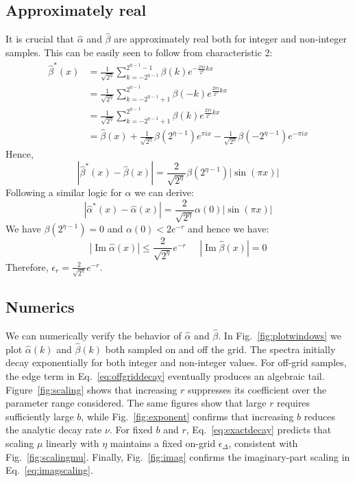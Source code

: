 \documentclass[aps,floatfix,10pt,amssymb,amsfont,amsmath,superscriptaddress,float,nofootinbib,longbibliography,nobalancelastpage,twocolumn]{revtex4-2}
\begin{document}
\subsection{Approximately real}
\label{section:approxiamtely_real}
It is crucial that $\hat \alpha$ and $\hat \beta$ are approximately real both for integer and non-integer samples. This can be easily seen to follow from characteristic 2:
\begin{align}
    \hat\beta^*(x) &=\frac{1}{\sqrt{2^{\eta}}}\sum_{k=-2^{\eta-1}}^{2^{\eta-1}-1} \beta(k)e^{-\frac{2\pi i}{2^{\eta}}kx}\\
    &=\frac{1}{\sqrt{2^{\eta}}}\sum_{k=-2^{\eta-1}+1}^{2^{\eta-1}} \beta(-k)e^{\frac{2\pi i}{2^{\eta}}kx}\\
    &=\frac{1}{\sqrt{2^{\eta}}}\sum_{k=-2^{\eta-1}+1}^{2^{\eta-1}} \beta(k)e^{\frac{2\pi i}{2^{\eta}}kx}\\
    &=\hat \beta(x) + \frac{1}{\sqrt{2^{\eta}}}\beta(2^{\eta-1})e^{\pi i x} - \frac{1}{\sqrt{2^{\eta}}}\beta(-2^{\eta-1})e^{-\pi i x}
\end{align}
Hence,
\begin{equation}
    |\hat\beta^*(x)- \hat\beta(x)| =  \frac{2}{\sqrt{2^{\eta}}}\beta(2^{\eta-1})|\sin (\pi x)|
\end{equation}
Following a similar logic for $\alpha$ we can derive:
\begin{equation}
        |\hat\alpha^*(x)- \hat\alpha(x)| =  \frac{2}{\sqrt{2^{\eta}}}\alpha(0)|\sin (\pi x)|
\end{equation}
We have $\beta(2^{\eta-1}) =0$ and $\alpha(0) < 2e^{-r}$ and hence we have:
\begin{equation}
    \label{eq:imagscaling}|\operatorname{Im}\hat\alpha(x)| \leq \frac{2}{\sqrt{2^{\eta}}}e^{-r} \;\;\;\;\;|\operatorname{Im}\hat\beta(x)| = 0
\end{equation}
Therefore, $\epsilon_r = \frac{2}{\sqrt{2^{\eta}}}e^{-r}$.
\subsection{Numerics}
We can numerically verify the behavior of $\hat \alpha$ and $\hat \beta$. In Fig.~\ref{fig:plotwindows} we plot $\hat \alpha(k)$ and $\hat \beta(k)$ both sampled on and off the grid. The spectra initially decay exponentially for both integer and non-integer values. For off-grid samples, the edge term in Eq.~\eqref{eq:offgriddecay} eventually produces an algebraic tail. Figure~\ref{fig:scaling} shows that increasing $r$ suppresses its coefficient over the parameter range considered. The same figures show that large $r$ requires sufficiently large $b$, while Fig.~\ref{fig:exponent} confirms that increasing $b$ reduces the analytic decay rate $\nu$. For fixed $b$ and $r$, Eq.~\eqref{eq:exactdecay} predicts that scaling $\mu$ linearly with $\eta$ maintains a fixed on-grid $\epsilon_{\Delta}$, consistent with Fig.~\ref{fig:scalingmu}. Finally, Fig.~\ref{fig:imag} confirms the imaginary-part scaling in Eq.~\eqref{eq:imagscaling}.
\end{document}
